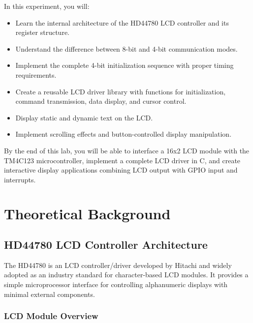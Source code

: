 \noindent In this experiment, you will:
\begin{itemize}[nosep]
  \item Learn the internal architecture of the HD44780 LCD controller and its register structure.
  \item Understand the difference between 8-bit and 4-bit communication modes.
  \item Implement the complete 4-bit initialization sequence with proper timing requirements.
  \item Create a reusable LCD driver library with functions for initialization, command transmission, data display, and cursor control.
  \item Display static and dynamic text on the LCD.
  \item Implement scrolling effects and button-controlled display manipulation.
\end{itemize}

By the end of this lab, you will be able to interface a 16x2 LCD module with the TM4C123 microcontroller, implement a complete LCD driver in C, and create interactive display applications combining LCD output with GPIO input and interrupts.

\newpage
{}
\localtableofcontents
\bigskip
\newpage

\section{Theoretical Background}

\subsection{HD44780 LCD Controller Architecture}

The HD44780 is an LCD controller/driver developed by Hitachi and widely adopted as an industry standard for character-based LCD modules. It provides a simple microprocessor interface for controlling alphanumeric displays with minimal external components.

\subsubsection{LCD Module Overview}

